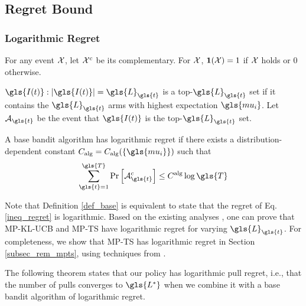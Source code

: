 \subsection{Regret Bound}

\subsubsection{Logarithmic Regret} 

\label{regretbound}
For any event $\mathcal{X}$, let $\mathcal{X}^c$ be its complementary. For $\mathcal{X}$, $\mathbf{1}(\mathcal{X}) = 1$ if $\mathcal{X}$ holds or $0$ otherwise.

\begin{definition} 
$\gls{I(t)}: |\gls{I(t)}|=\gls{L}_{\gls{t}}$ is a top-$\gls{L}_{\gls{t}}$ set if it contains the $\gls{L}_{\gls{t}}$ arms with highest expectation $\gls{mu_i}$. Let $\mA_{\gls{t}}$ be the event that $\gls{I(t)}$ is the top-$\gls{L}_{\gls{t}}$ set. 
\end{definition}%
\begin{definition}\label{def_base} 
A base bandit algorithm has logarithmic regret if there exists a distribution-de\-pen\-dent constant $C_{\mathrm{alg}} = C_{\mathrm{alg}}(\{\gls{mu_i}\})$ such that 
\[
\sum_{\gls{t}=1}^{\gls{T}} \Pr\left[\mA^c_ {\gls{t}}\right] \le C^{\mathrm{alg}} \log \gls{T}
\] 
\end{definition}
\begin{remark}\label{rem_co} Note that Definition \ref{def_base} is equivalent to state that the regret of Eq. \eqref{ineq_regret} is logarithmic. 
Based on the existing analyses \cite{DBLP:conf/nips/ChenHLLLL16}, one can prove that \gls{MP-KL-UCB} \cite{DBLP:journals/jmlr/GarivierC11} and \gls{MP-TS} \cite{DBLP:conf/icml/KomiyamaHN15} have logarithmic regret for varying $\gls{L}_{\gls{t}}$. For completeness, we show that \gls{MP-TS} has logarithmic regret in Section \ref{subsec_rem_mpts}, using techniques from \cite{DBLP:conf/aistats/AgrawalG13}. 
\end{remark}

The following theorem states that our policy has logarithmic pull regret, i.e., that the number of pulls converges to $\gls{L^*}$ when we combine it with a base bandit algorithm of logarithmic regret. 

